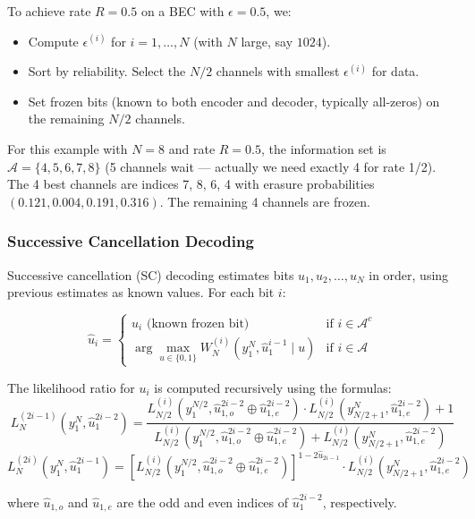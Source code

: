 \begin{example}[Channel Polarization for $N=2$: Detailed Example]
To achieve rate $R = 0.5$ on a BEC with $\epsilon = 0.5$, we:
\begin{itemize}
\item Compute $\epsilon^{(i)}$ for $i = 1, \dots, N$ (with $N$ large, say $1024$).
\item Sort by reliability. Select the $N/2$ channels with smallest $\epsilon^{(i)}$ for data.
\item Set frozen bits (known to both encoder and decoder, typically all-zeros) on the remaining $N/2$ channels.
\end{itemize}

For this example with $N = 8$ and rate $R = 0.5$, the information set is $\mathcal{A} = \{4, 5, 6, 7, 8\}$ (5 channels wait — actually we need exactly 4 for rate 1/2). The 4 best channels are indices 7, 8, 6, 4 with erasure probabilities $(0.121, 0.004, 0.191, 0.316)$. The remaining 4 channels are frozen.
\end{example}

\subsubsection*{Successive Cancellation Decoding}

Successive cancellation (SC) decoding estimates bits $u_1, u_2, \dots, u_N$ in order, using previous estimates as known values. For each bit $i$:

\[
\hat{u}_i = \begin{cases}
u_i \text{ (known frozen bit)} & \text{if } i \in \mathcal{A}^c \\
\arg\max_{u \in \{0,1\}} W_N^{(i)}(y_1^N, \hat{u}_1^{i-1} \mid u) & \text{if } i \in \mathcal{A}
\end{cases}
\]

The likelihood ratio for $u_i$ is computed recursively using the formulas:
\[
L_N^{(2i-1)}(y_1^N, \hat{u}_1^{2i-2}) = \frac{L_{N/2}^{(i)}(y_1^{N/2}, \hat{u}_{1,o}^{2i-2} \oplus \hat{u}_{1,e}^{2i-2}) \cdot L_{N/2}^{(i)}(y_{N/2+1}^N, \hat{u}_{1,e}^{2i-2}) + 1}{L_{N/2}^{(i)}(y_1^{N/2}, \hat{u}_{1,o}^{2i-2} \oplus \hat{u}_{1,e}^{2i-2}) + L_{N/2}^{(i)}(y_{N/2+1}^N, \hat{u}_{1,e}^{2i-2})}
\]
\[
L_N^{(2i)}(y_1^N, \hat{u}_1^{2i-1}) = \left[ L_{N/2}^{(i)}(y_1^{N/2}, \hat{u}_{1,o}^{2i-2} \oplus \hat{u}_{1,e}^{2i-2}) \right]^{1 - 2\hat{u}_{2i-1}} \cdot L_{N/2}^{(i)}(y_{N/2+1}^N, \hat{u}_{1,e}^{2i-2})
\]

where $\hat{u}_{1,o}$ and $\hat{u}_{1,e}$ are the odd and even indices of $\hat{u}_1^{2i-2}$, respectively.

